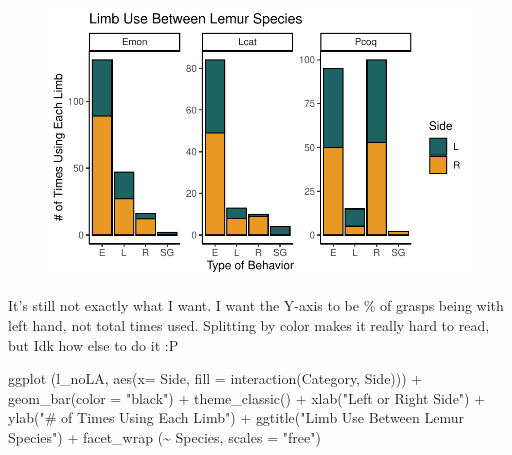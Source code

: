 \documentclass[
  letterpaper,
  DIV=11,
  numbers=noendperiod]{scrartcl}
\newenvironment{Shaded}{\begin{snugshade}}{\end{snugshade}}
\newcommand{\AttributeTok}[1]{\textcolor[rgb]{0.40,0.45,0.13}{#1}}
\newcommand{\FunctionTok}[1]{\textcolor[rgb]{0.28,0.35,0.67}{#1}}
\newcommand{\NormalTok}[1]{\textcolor[rgb]{0.00,0.23,0.31}{#1}}
\newcommand{\SpecialCharTok}[1]{\textcolor[rgb]{0.37,0.37,0.37}{#1}}
\newcommand{\StringTok}[1]{\textcolor[rgb]{0.13,0.47,0.30}{#1}}
\begin{document}
\begin{figure}[H]

{\centering \includegraphics{LeftyLemurs_files/figure-pdf/unnamed-chunk-46-1.pdf}

}

\end{figure}

It's still not exactly what I want. I want the Y-axis to be \% of grasps
being with left hand, not total times used. Splitting by color makes it
really hard to read, but Idk how else to do it :P

\begin{Shaded}
\begin{Highlighting}[]
\FunctionTok{ggplot}\NormalTok{ (l\_noLA, }\FunctionTok{aes}\NormalTok{(}\AttributeTok{x=}\NormalTok{ Side, }\AttributeTok{fill =} \FunctionTok{interaction}\NormalTok{(Category, Side))) }\SpecialCharTok{+}
  \FunctionTok{geom\_bar}\NormalTok{(}\AttributeTok{color =} \StringTok{"black"}\NormalTok{) }\SpecialCharTok{+}
  \FunctionTok{theme\_classic}\NormalTok{() }\SpecialCharTok{+}
  \FunctionTok{xlab}\NormalTok{(}\StringTok{"Left or Right Side"}\NormalTok{) }\SpecialCharTok{+}
  \FunctionTok{ylab}\NormalTok{(}\StringTok{"\# of Times Using Each Limb"}\NormalTok{) }\SpecialCharTok{+}
  \FunctionTok{ggtitle}\NormalTok{(}\StringTok{"Limb Use Between Lemur Species"}\NormalTok{) }\SpecialCharTok{+}
  \FunctionTok{facet\_wrap}\NormalTok{ (}\SpecialCharTok{\textasciitilde{}}\NormalTok{ Species, }\AttributeTok{scales =} \StringTok{"free"}\NormalTok{)}
\end{Highlighting}
\end{Shaded}
\end{document}
